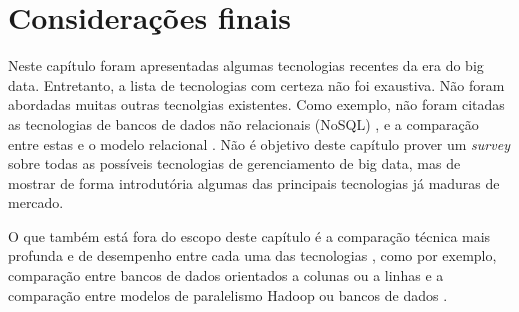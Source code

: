 \section{Considerações finais}
\label{sec:final}

Neste capítulo foram apresentadas algumas tecnologias recentes da era do big data. Entretanto, 
a lista de tecnologias com certeza não foi exaustiva. Não foram abordadas muitas outras
tecnolgias existentes. Como exemplo, não foram citadas as tecnologias de bancos de dados
não relacionais (NoSQL) \citep{han2011survey}, e a comparação entre estas e 
o modelo relacional \citep{cattell2011scalable, stonebraker2010sql, stonebraker2012newsql}.
Não é objetivo deste capítulo prover um \textit{survey} sobre todas as
possíveis tecnologias de gerenciamento de big data, mas de mostrar de forma introdutória
algumas das principais tecnologias já maduras de mercado.

O que também está fora do escopo deste capítulo é a comparação técnica mais profunda e 
de desempenho entre cada uma das tecnologias \citep{Pavlo2009}, como por exemplo, comparação entre 
bancos de dados orientados a colunas ou a linhas \citep{Abadi2008} e a comparação entre
modelos de paralelismo Hadoop ou bancos de dados \citep{Stonebraker2010}. 

